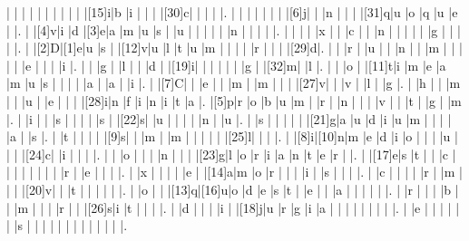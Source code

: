 \documentclass[12pt]{article}
\begin{document}
\begin{Puzzle}{22}{24}
  |{}  |{}  |{}  |{}  |{}  |{}  |{}  |{}  |{}  |{}  |[15]i|b   |i   |{}  |{}  |{}  |[30]c|{}  |{}  |{}  |{}  |.
  |{}  |{}  |{}  |{}  |{}  |{}  |{}  |[6]j|{}  |{}  |n   |{}  |{}  |{}  |[31]q|u   |o   |q   |u   |e   |{}  |.
  |{}  |[4]v|i   |d   |[3]e|a   |m   |u   |s   |{}  |u   |{}  |{}  |{}  |{}  |{}  |n   |{}  |{}  |{}  |{}  |.
  |{}  |{}  |{}  |{}  |x   |{}  |{}  |c   |{}  |{}  |n   |{}  |{}  |{}  |{}  |{}  |g   |{}  |{}  |{}  |{}  |.
  |{}  |[2]D|[1]e|u   |s   |{}  |[12]v|u   |l   |t   |u   |m   |{}  |{}  |{}  |{}  |r   |{}  |{}  |{}  |[29]d|.
  |{}  |{}  |r   |{}  |u   |{}  |{}  |n   |{}  |{}  |m   |{}  |{}  |{}  |{}  |{}  |e   |{}  |{}  |{}  |i   |.
  |{}  |{}  |g   |{}  |l   |{}  |{}  |d   |{}  |[19]i|{}  |{}  |{}  |{}  |{}  |{}  |g   |{}  |[32]m|{}  |l   |.
  |{}  |{}  |o   |{}  |[11]t|i   |m   |e   |a   |m   |u   |s   |{}  |{}  |{}  |{}  |a   |{}  |a   |{}  |i   |.
  |{}  |[7]C|{}  |{}  |e   |{}  |{}  |m   |{}  |m   |{}  |{}  |{}  |[27]v|{}  |{}  |v   |{}  |l   |{}  |g   |.
  |{}  |h   |{}  |{}  |m   |{}  |{}  |u   |{}  |e   |{}  |{}  |{}  |[28]i|n   |f   |i   |n   |i   |t   |a   |.
  |[5]p|r   |o   |b   |u   |m   |{}  |r   |{}  |n   |{}  |{}  |{}  |v   |{}  |{}  |t   |{}  |g   |{}  |m   |.
  |{}  |i   |{}  |{}  |s   |{}  |{}  |{}  |{}  |s   |{}  |[22]s|{}  |u   |{}  |{}  |{}  |{}  |n   |{}  |u   |.
  |{}  |s   |{}  |{}  |{}  |{}  |{}  |[21]g|a   |u   |d   |i   |u   |m   |{}  |{}  |{}  |{}  |a   |{}  |s   |.
  |{}  |t   |{}  |{}  |{}  |{}  |[9]s|{}  |{}  |m   |{}  |m   |{}  |{}  |{}  |{}  |{}  |[25]l|{}  |{}  |{}  |.
  |{}  |[8]i|[10]n|m   |e   |d   |i   |o   |{}  |{}  |{}  |u   |{}  |{}  |{}  |[24]c|{}  |i   |{}  |{}  |{}  |.
  |{}  |{}  |o   |{}  |{}  |{}  |n   |{}  |{}  |{}  |[23]g|l   |o   |r   |i   |a   |n   |t   |e   |r   |{}  |.
  |{}  |[17]e|s   |t   |{}  |{}  |c   |{}  |{}  |{}  |{}  |{}  |{}  |{}  |{}  |r   |{}  |e   |{}  |{}  |{}  |.
  |{}  |x   |{}  |{}  |{}  |{}  |e   |{}  |[14]a|m   |o   |r   |{}  |{}  |{}  |i   |{}  |s   |{}  |{}  |{}  |.
  |{}  |c   |{}  |{}  |{}  |{}  |r   |{}  |m   |{}  |{}  |{}  |[20]v|{}  |{}  |t   |{}  |{}  |{}  |{}  |{}  |.
  |{}  |o   |{}  |{}  |[13]q|[16]u|o   |d   |e   |s   |t   |{}  |e   |{}  |{}  |a   |{}  |{}  |{}  |{}  |{}  |.
  |{}  |r   |{}  |{}  |{}  |b   |{}  |{}  |m   |{}  |{}  |{}  |r   |{}  |{}  |[26]s|i   |t   |{}  |{}  |{}  |.
  |{}  |d   |{}  |{}  |{}  |i   |{}  |[18]j|u   |r   |g   |i   |a   |{}  |{}  |{}  |{}  |{}  |{}  |{}  |{}  |.
  |{}  |e   |{}  |{}  |{}  |{}  |{}  |{}  |s   |{}  |{}  |{}  |{}  |{}  |{}  |{}  |{}  |{}  |{}  |{}  |{}  |.
\end{Puzzle}
\end{document}
